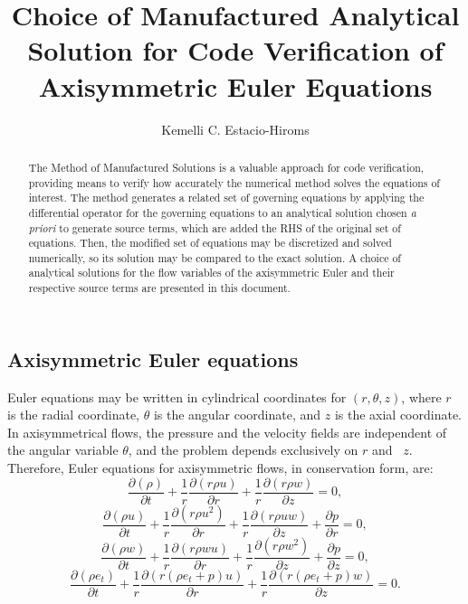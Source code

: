 \documentclass[a4paper,10pt]{article}
\title{Choice of Manufactured Analytical Solution for Code Verification of Axisymmetric Euler Equations}
\author{Kemelli C. Estacio-Hiroms}
\newcommand{\Diff}[2] {\dfrac{\partial( #1)}{\partial #2}}
\newcommand{\diff}[2] {\dfrac{\partial #1}{\partial #2}}
\begin{document}
\begin{landscape}
 
\maketitle

\begin{abstract}
The Method of Manufactured Solutions is a valuable approach for code verification, providing means to verify how accurately the numerical method solves the equations of interest. The method generates a related set of governing equations by applying the differential operator for the governing equations to an analytical solution chosen \textit{a priori} to generate source terms, which are added the RHS of the original set of equations. Then, the modified set of equations may be discretized and solved numerically, so its solution may be compared to the exact solution. A choice of analytical solutions for the flow variables of the axisymmetric Euler and their respective source terms are presented in this document.
\end{abstract}

\section{Axisymmetric Euler equations}

Euler equations may be written in cylindrical coordinates for $(r,\theta,z)$, where $r$ is the radial coordinate, $\theta$ is the angular coordinate, and $z$ is the axial coordinate. In axisymmetrical flows, the pressure and the velocity fields are independent of the angular variable $\theta$, and the problem depends exclusively on $r$ and~ $z$. Therefore, Euler equations for axisymmetric flows, in conservation form,  are:
\begin{equation}
 \label{eq:ns_c_01}
\Diff{\rho}{t}+ \dfrac{1}{r} \Diff{ r \rho  u}{r}+ \dfrac{1}{r}\Diff{r \rho  w}{z}=0,
\end{equation}
\begin{equation}
\label{eq:ns_c_02}
\Diff{\rho u}{t} +\dfrac{1}{r}\Diff{r \rho u^2 }{r}+ \dfrac{1}{r}\Diff{r \rho u w}{z}+\diff{p}{r}=0,
\end{equation}
\begin{equation}
\label{eq:ns_c_03}
\Diff{\rho w}{t} + \dfrac{1}{r}\Diff{r \rho w u }{r}+ \dfrac{1}{r}\Diff{r \rho w^2 }{z}+\diff{p}{z}=0,
\end{equation}
\begin{equation}
\label{eq:ns_c_04}
\Diff{\rho e_t}{ t}+\dfrac{1}{r}\Diff{r(\rho e_t+p) u}{ r}+\dfrac{1}{r}\Diff{r(\rho e_t+p)w}{z}=0.
\end{equation}



\end{landscape}
\end{document}
